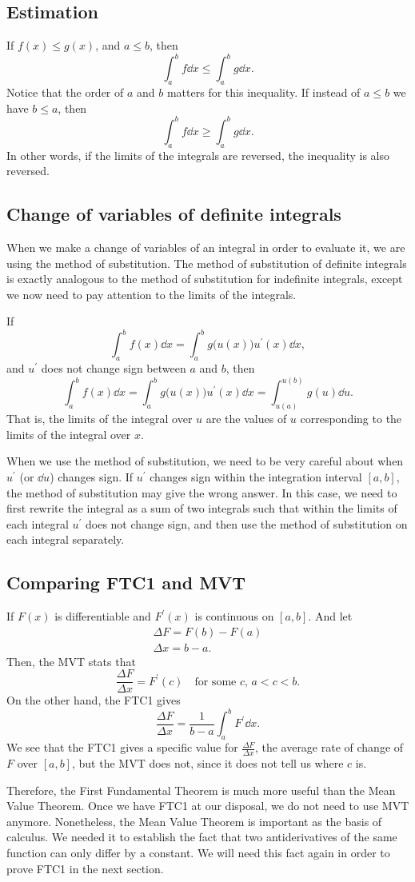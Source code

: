 \subsection{Estimation}
If $f(x)\leq g(x)$, and $a\leq b$, then
\[\int_a^bf\dd x\leq\int_a^bg\dd x.\]
Notice that the order of $a$ and $b$ matters for this inequality. If instead of $a\leq b$ we have $b\leq a$, then
\[\int_a^bf\dd x\geq\int_a^bg\dd x.\]
In other words, if the limits of the integrals are reversed, the inequality is also reversed.
\subsection{Change of variables of definite integrals}
When we make a change of variables of an integral in order to evaluate it, we are using the method of substitution. The method of substitution of definite integrals is exactly analogous to the method of substitution for indefinite integrals, except we now need to pay attention to the limits of the integrals.

If
\[\int_a^bf(x)\dd x=\int_a^b g\lparen u(x)\rparen u^\prime(x)\dd x,\]
and $u^\prime$ does not change sign between $a$ and $b$, then
\[\int_a^bf(x)\dd x=\int_a^bg\lparen u(x)\rparen u^\prime(x)\dd x=\int_{u(a)}^{u(b)}g(u)\dd u.\]
That is, the limits of the integral over $u$ are the values of $u$ corresponding to the limits of the integral over $x$.
\begin{note}[Caution]
When we use the method of substitution, we need to be very careful about when $u^\prime$ (or $\dd u$) changes sign. If $u^\prime$ changes sign within the integration interval $[a,b]$, the method of substitution may give the wrong answer. In this case, we need to first rewrite the integral as a sum of two integrals such that within the limits of each integral $u^\prime$ does not change sign, and then use the method of substitution on each integral separately.
\end{note}
\subsection{Comparing FTC1 and MVT}
If $F(x)$ is differentiable and $F^\prime(x)$ is continuous on $[a,b]$. And let
\begin{gather*}
\Delta F=F(b)-F(a)\\
\Delta x=b-a.
\end{gather*}
Then, the MVT stats that
\[\frac{\Delta F}{\Delta x}=F^\prime(c)\quad\text{for some $c$, $a<c<b$}.\]
On the other hand, the FTC1 gives
\[\frac{\Delta F}{\Delta x}=\frac1{b-a}\int_a^bF^\prime\dd x.\]
We see that the FTC1 gives a specific value for $\frac{\Delta F}{\Delta x}$, the average rate of change of $F$ over $[a,b]$, but the MVT does not, since it does not tell us where $c$ is.

Therefore, the First Fundamental Theorem is much more useful than the Mean Value Theorem. Once we have FTC1 at our disposal, we do not need to use MVT anymore. Nonetheless, the Mean Value Theorem is important as the basis of calculus. We needed it to establish the fact that two antiderivatives of the same function can only differ by a constant. We will need this fact again in order to prove FTC1 in the next section.
